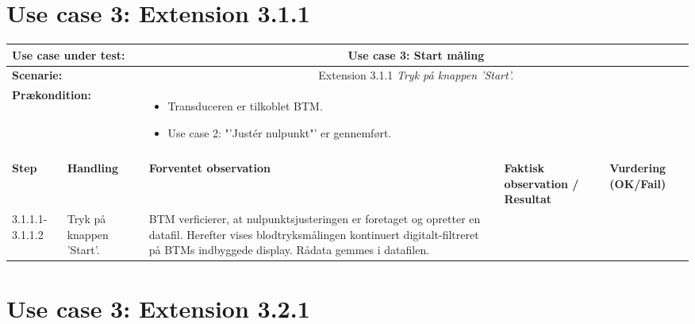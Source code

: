 \section{Use case 3: Extension 3.1.1}
\begin{tabular}{|p{1cm}|p{3cm}|p{4cm}|p{4cm}|p{2cm}|}
\hline
\multicolumn{2}{|p{3cm}|}{\textbf{Use case under test:}} & \multicolumn{3}{c|}{Use case 3: Start måling} \\\hline

\multicolumn{2}{|p{3cm}|}{\textbf{Scenarie:}} & \multicolumn{3}{c|}{Extension 3.1.1 \textit{Tryk på knappen 'Start'.}} \\\hline

\multicolumn{2}{|p{3cm}|}{\textbf{Prækondition:}}  & \multicolumn{3}{l|}{\parbox{0.6\textwidth}{
\begin{itemize}[label=$\circ$]
\item Transduceren er tilkoblet BTM.
\item Use case 2: "'Justér nulpunkt"' er gennemført. 
\end{itemize} }}\\\hline

\multicolumn{5}{|c|}{} \\\hline

\textbf{Step} & \textbf{Handling} & \textbf{Forventet observation} & \textbf{Faktisk observation / Resultat} & \textbf{Vurdering (OK/Fail)}\\\hline

3.1.1.1-3.1.1.2 & Tryk på knappen 'Start'. & BTM verficierer, at nulpunktsjusteringen er foretaget og opretter en datafil. Herefter vises blodtryksmålingen kontinuert digitalt-filtreret på BTMs indbyggede display. Rådata gemmes i datafilen. & & \\\hline

\end{tabular}

\newpage

\section{Use case 3: Extension 3.2.1}

